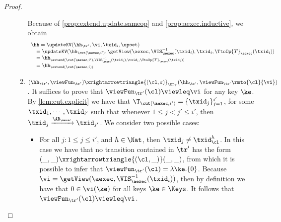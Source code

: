 \begin{proof}
\begin{itemize}
\begin{enumerate}
Because of \cref{prop:extend.update.sameop} and \cref{prop:aexec.inductive},
we obtain 
\[
\begin{array}{l}
\hh = \updateKV(\hh_{\tr'}, \vi, \txid_{i}, \opset) \\
\quad = \updateKV(\hh_{\cut(\aexec, i')}, \getView(\aexec, \VIS^{-1}_{\aexec}(\txid_{i}), \txid_{i}, \TtoOp{T}_{\aexec}(\txid_{i})) \\
\quad = \hh_{\extend(\cut(\aexec, i'), \VIS^{-1}_{\aexec}(\txid_{i}), \txid_{i}, \TtoOp{T}_{\aexec}(\txid_{i})) } \\
\quad = \hh_{\extend(\cut(\aexec, i))}
\end{array}
\]

\item $(\hh_{\tr'}, \viewFun_{\tr'}) \xrightarrowtriangle{(\cl, \varepsilon)}_{\ET_{\top}} (\hh_{\tr'}, \viewFun_{\tr'}\rmto{\cl}{\vi})$. 
It suffices to prove that $\viewFun_{\tr'}(\cl) \viewleq \vi$ for any key $\ke$.
By \cref{lem:cut.explicit} we have that $\T_{\cut(\aexec, i')} = \{\txid_{j}\}_{j=1}^{i'}$, for 
some $\txid_{1},\cdots, \txid_{i'}$ such that whenever $1 \leq j < j' \leq i'$, then 
$\txid_{j} \xrightarrow{\AR_{\aexec}} \txid_{j'}$. We consider two possible cases: 

\begin{itemize}
\item For all $j : 1 \leq j \leq i'$, and $h \in \Nat$, then $\txid_{j} \neq \txid_{\cl}^{h}$.
In this case we have that no transition contained in $\tr'$ has the form 
$(\_, \_) \xrightarrowtriangle{(\cl, \_)} (\_, \_)$, from which it is possible to infer 
that  $\viewFun_{\tr'}(\cl) = \lambda \ke. \{0\}$. Because $\vi = \getView(\aexec, \VIS^{-1}_{\aexec}(\txid_{i}))$, 
then by definition we have that $0 \in \vi(\ke)$ for all keys $\ke \in \Keys$. It follows that 
$\viewFun_{\tr'}(\cl) \viewleq \vi$. 


\end{itemize}
\end{enumerate}
\end{itemize}
\end{proof}
